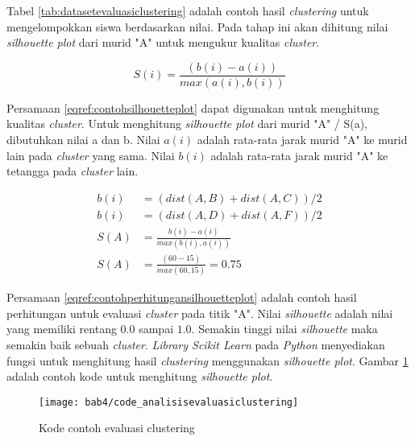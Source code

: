 Tabel \ref{tab:datasetevaluasiclustering} adalah contoh hasil  \textit{clustering} untuk mengelompokkan siswa berdasarkan nilai. Pada tahap ini akan dihitung nilai \textit{silhouette plot} dari murid "A" untuk mengukur kualitas \textit{cluster}.

\begin{equation}
 S(i) = \frac{(b(i)-a(i))}{max(a(i),b(i))}
 \label{eqref:contohsilhouetteplot}
\end{equation}

Persamaan \ref{eqref:contohsilhouetteplot} dapat digunakan untuk menghitung kualitas \textit{cluster}. Untuk menghitung \textit{silhouette plot} dari murid "A" / S(a), dibutuhkan nilai a dan b. Nilai $a(i)$ adalah rata-rata jarak murid "A" ke murid lain pada \textit{cluster} yang sama. Nilai $b(i)$ adalah rata-rata jarak murid "A" ke tetangga pada \textit{cluster} lain.

\begin{equation}
\label{eqref:contohperhitungansilhouetteplot}
\begin{split}
b(i) & = (dist(A,B) + dist(A,C)) / 2 \\
b(i) & = (dist(A,D) + dist(A,F)) / 2 \\
S(A)& = \frac{b(i)-a(i)}{max(b(i),a(i))} \\
 S(A) & = \frac{(60-15)}{max(60,15)} = 0.75
\end{split}
\end{equation}

Persamaan \ref{eqref:contohperhitungansilhouetteplot} adalah contoh hasil perhitungan untuk evaluasi \textit{cluster} pada titik "A". Nilai \textit{silhouette} adalah nilai yang memiliki rentang $0.0$ sampai $1.0$. Semakin tinggi nilai \textit{silhouette} maka semakin baik sebuah \textit{cluster}.
\textit{Library Scikit Learn} pada \textit{Python} menyediakan fungsi untuk menghitung hasil \textit{clustering} menggunakan \textit{silhouette plot}. Gambar \ref{fig:code_analisisevaluasiclustering} adalah contoh kode untuk menghitung \textit{silhouette plot}.

%

\begin{figure}[H]
	\centering  
	\texttt{[image: bab4/code\_analisisevaluasiclustering]}   
	\caption{Kode contoh evaluasi clustering}
	\label{fig:code_analisisevaluasiclustering} 
\end{figure} 

